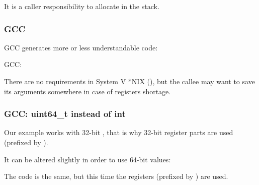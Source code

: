 It is a \gls{caller} responsibility to allocate  in the stack.

\subsubsection{GCC}

\Optimizing GCC generates more or less understandable code:



\NonOptimizing GCC:




There are no  requirements in System V *NIX (\SysVABI), but the \gls{callee} may want to save
its arguments somewhere in case of registers shortage.

\subsubsection{GCC: uint64\_t instead of int}


Our example works with 32-bit \Tint, that is why 32-bit register parts are used (prefixed by ).

It can be altered slightly in order to use 64-bit values:





The code is the same, but this time the  registers (prefixed by ) are used.

